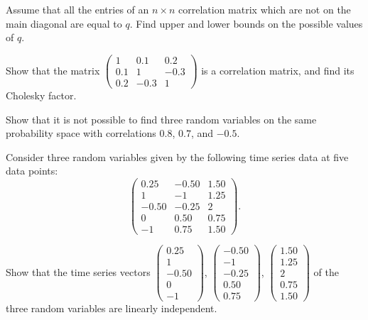 \begin{exercises}
\item Assume that all the entries of an $n \times n$ correlation matrix which are not on
the main diagonal are equal to $q$. Find upper and lower bounds on the possible values
of $q$.

\item Show that the matrix
$\begin{pmatrix} 1 & 0.1 & 0.2 \\ 0.1 & 1 & -0.3 \\ 0.2 & -0.3 & 1 \end{pmatrix}$ is a
correlation matrix, and find its Cholesky factor.

\item Show that it is not possible to find three random variables on the same
probability space with correlations $0.8$, $0.7$, and $-0.5$.

\item Consider three random variables given by the following time series data at five
data points:
\[
\begin{pmatrix}
0.25 & -0.50 & 1.50 \\
1 & -1 & 1.25 \\
-0.50 & -0.25 & 2 \\
0 & 0.50 & 0.75 \\
-1 & 0.75 & 1.50
\end{pmatrix}.
\]

\begin{subparts}
\item Show that the time series vectors
$\begin{pmatrix} 0.25 \\ 1 \\ -0.50 \\ 0 \\ -1 \end{pmatrix}$,
$\begin{pmatrix} -0.50 \\ -1 \\ -0.25 \\ 0.50 \\ 0.75 \end{pmatrix}$,
$\begin{pmatrix} 1.50 \\ 1.25 \\ 2 \\ 0.75 \\ 1.50 \end{pmatrix}$ of the three random
variables are linearly independent.


\end{subparts}
\end{exercises}
